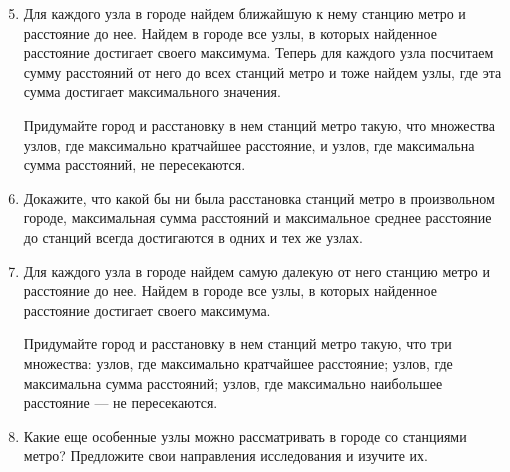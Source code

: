 \begin{enumerate} \setcounter{enumi}{4}

\item Для каждого узла в городе найдем ближайшую к нему станцию метро и расстояние до нее. Найдем в городе все узлы, в которых найденное расстояние достигает своего максимума. Теперь для каждого узла посчитаем сумму расстояний от него до всех станций метро и тоже найдем узлы, где эта сумма достигает максимального значения.

\smallskip\noindent Придумайте город и расстановку в нем станций метро такую, что множества узлов, где максимально кратчайшее расстояние, и узлов, где максимальна сумма расстояний, не пересекаются.

\item Докажите, что какой бы ни была расстановка станций метро в произвольном городе, максимальная сумма расстояний и максимальное среднее расстояние до станций всегда достигаются в одних и тех же узлах.

\item Для каждого узла в городе найдем самую далекую от него станцию метро и расстояние до нее. Найдем в городе все узлы, в которых найденное расстояние достигает своего максимума.

\smallskip\noindent Придумайте город и расстановку в нем станций метро такую, что три множества: узлов, где максимально кратчайшее расстояние; узлов, где максимальна сумма расстояний; узлов, где максимально наибольшее расстояние — не пересекаются.

\item Какие еще особенные узлы можно рассматривать в городе со станциями метро?  Предложите свои направления исследования и изучите их.

\end{enumerate}
